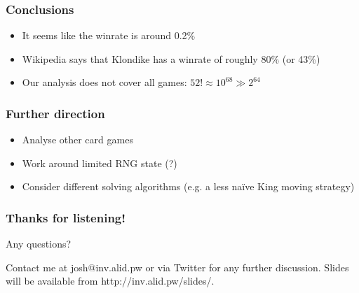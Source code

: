 \documentclass{beamer}
\begin{document}
\begin{frame}
\frametitle{Conclusions}
\begin{itemize}
\item It seems like the winrate is around 0.2\%
\item Wikipedia says that Klondike has a winrate of roughly 80\% (or 43\%)
\item Our analysis does not cover all games: $52! \approx 10^{68} \gg 2^{64}$
\end{itemize}
\end{frame}

\begin{frame}
\frametitle{Further direction}
\begin{itemize}
\item Analyse other card games
\item Work around limited RNG state (?)
\item Consider different solving algorithms (e.g. a less naïve King moving strategy)
\end{itemize}
\end{frame}

\begin{frame}
\frametitle{Thanks for listening!}

Any questions? \the\parskip

\bigskip

Contact me at josh@inv.alid.pw or via Twitter for any further discussion.
Slides will be available from http://inv.alid.pw/slides/.

\end{frame}
\end{document}
